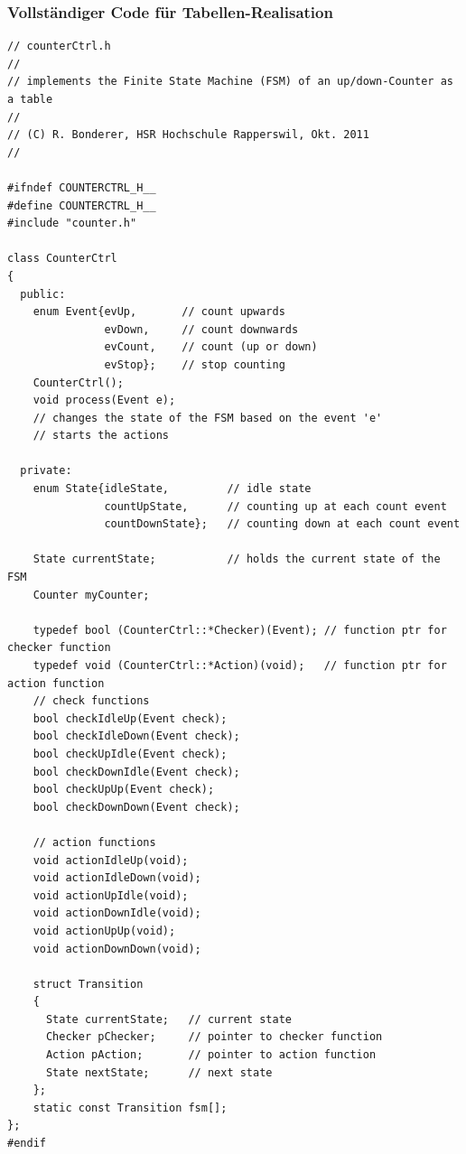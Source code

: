 \subsubsection{Vollständiger Code für Tabellen-Realisation}
\begin{lstlisting}
// counterCtrl.h
//
// implements the Finite State Machine (FSM) of an up/down-Counter as a table
//
// (C) R. Bonderer, HSR Hochschule Rapperswil, Okt. 2011
//

#ifndef COUNTERCTRL_H__
#define COUNTERCTRL_H__
#include "counter.h"

class CounterCtrl
{
  public:
    enum Event{evUp,       // count upwards
               evDown,     // count downwards
               evCount,    // count (up or down)
               evStop};    // stop counting
    CounterCtrl();
    void process(Event e);
    // changes the state of the FSM based on the event 'e'
    // starts the actions

  private:
    enum State{idleState,         // idle state
               countUpState,      // counting up at each count event
               countDownState};   // counting down at each count event

    State currentState;           // holds the current state of the FSM
    Counter myCounter;
    
    typedef bool (CounterCtrl::*Checker)(Event); // function ptr for checker function
    typedef void (CounterCtrl::*Action)(void);   // function ptr for action function
    // check functions
    bool checkIdleUp(Event check);
    bool checkIdleDown(Event check);
    bool checkUpIdle(Event check);
    bool checkDownIdle(Event check);
    bool checkUpUp(Event check);
    bool checkDownDown(Event check);
    
    // action functions
    void actionIdleUp(void);
    void actionIdleDown(void);
    void actionUpIdle(void);
    void actionDownIdle(void);
    void actionUpUp(void);
    void actionDownDown(void);
    
    struct Transition
    {
      State currentState;   // current state
      Checker pChecker;     // pointer to checker function
      Action pAction;       // pointer to action function
      State nextState;      // next state
    };
    static const Transition fsm[];
};
#endif
\end{lstlisting}

